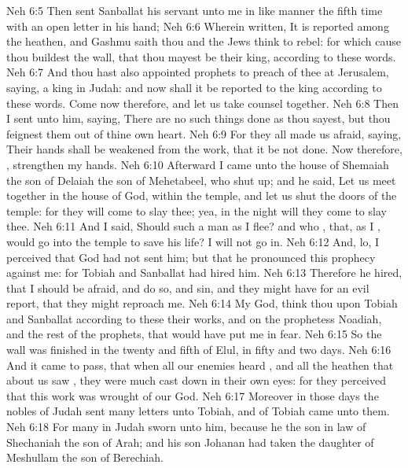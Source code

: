 \vs Neh 6:5 Then sent Sanballat his servant unto me in like manner the fifth time with an open letter in his hand;
\vs Neh 6:6 Wherein  written, It is reported among the heathen, and Gashmu saith  thou and the Jews think to rebel: for which cause thou buildest the wall, that thou mayest be their king, according to these words.
\vs Neh 6:7 And thou hast also appointed prophets to preach of thee at Jerusalem, saying,  a king in Judah: and now shall it be reported to the king according to these words. Come now therefore, and let us take counsel together.
\vs Neh 6:8 Then I sent unto him, saying, There are no such things done as thou sayest, but thou feignest them out of thine own heart.
\vs Neh 6:9 For they all made us afraid, saying, Their hands shall be weakened from the work, that it be not done. Now therefore, , strengthen my hands.
\vs Neh 6:10 Afterward I came unto the house of Shemaiah the son of Delaiah the son of Mehetabeel, who  shut up; and he said, Let us meet together in the house of God, within the temple, and let us shut the doors of the temple: for they will come to slay thee; yea, in the night will they come to slay thee.
\vs Neh 6:11 And I said, Should such a man as I flee? and who , that,  as I , would go into the temple to save his life? I will not go in.
\vs Neh 6:12 And, lo, I perceived that God had not sent him; but that he pronounced this prophecy against me: for Tobiah and Sanballat had hired him.
\vs Neh 6:13 Therefore  he hired, that I should be afraid, and do so, and sin, and  they might have  for an evil report, that they might reproach me.
\vs Neh 6:14 My God, think thou upon Tobiah and Sanballat according to these their works, and on the prophetess Noadiah, and the rest of the prophets, that would have put me in fear.
\vs Neh 6:15 So the wall was finished in the twenty and fifth  of  Elul, in fifty and two days.
\vs Neh 6:16 And it came to pass, that when all our enemies heard , and all the heathen that  about us saw , they were much cast down in their own eyes: for they perceived that this work was wrought of our God.
\vs Neh 6:17 Moreover in those days the nobles of Judah sent many letters unto Tobiah, and  of Tobiah came unto them.
\vs Neh 6:18 For  many in Judah sworn unto him, because he  the son in law of Shechaniah the son of Arah; and his son Johanan had taken the daughter of Meshullam the son of Berechiah.
